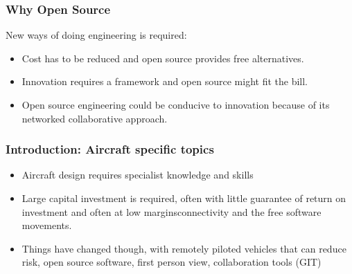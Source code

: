 \documentclass{beamer}
\begin{document}
\begin{frame}
\frametitle{Why Open Source}

New ways of doing engineering is required:

\begin{itemize}
\item Cost has to be reduced and open source provides free alternatives.
\item Innovation requires a framework and open source might fit the bill.
\item Open source engineering could be conducive to innovation because of its networked collaborative approach.
\end{itemize}
        
\end{frame}
        


\begin{frame}
\frametitle{Introduction:  Aircraft specific topics}

\begin{itemize}
\item Aircraft design requires specialist knowledge and skills  
\item Large capital investment is required, often with little guarantee of return on investment and often at low marginsconnectivity and the free software movements.
\item Things have changed though, with remotely piloted vehicles that can reduce risk, open source software, first person view, collaboration tools (GIT)
\end{itemize}

\end{frame}

\end{document}
